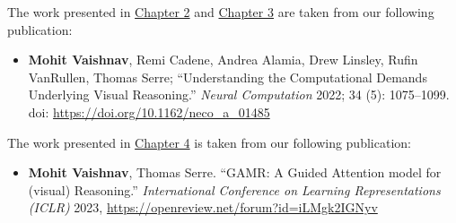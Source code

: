 The work presented in \hyperref[chapter1a]{Chapter 2} and \hyperref[chapter1b]{Chapter 3} are taken from our following publication:
\begin{itemize}
    \item \textbf{Mohit Vaishnav}, Remi Cadene, Andrea Alamia, Drew Linsley, Rufin VanRullen, Thomas Serre; ``Understanding the Computational Demands Underlying Visual Reasoning.'' \textit{Neural Computation} 2022; 34 (5): 1075–1099. doi: \url{https://doi.org/10.1162/neco_a_01485}
\end{itemize}

The work presented in \hyperref[chapter2b]{Chapter 4} is taken from our following publication:
\begin{itemize}
    \item \textbf{Mohit Vaishnav}, Thomas Serre. ``GAMR: A Guided Attention model for (visual) Reasoning.'' \textit{International Conference on Learning Representations (ICLR)} 2023, \href{https://openreview.net/forum?id=iLMgk2IGNyv}{https://openreview.net/forum?id=iLMgk2IGNyv}
\end{itemize}